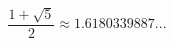 \documentclass{article}
\begin{document}
\begin{equation}
\frac{1 + \sqrt{5}}{2} \approx 1.6180339887...
\end{equation}
\end{document}
